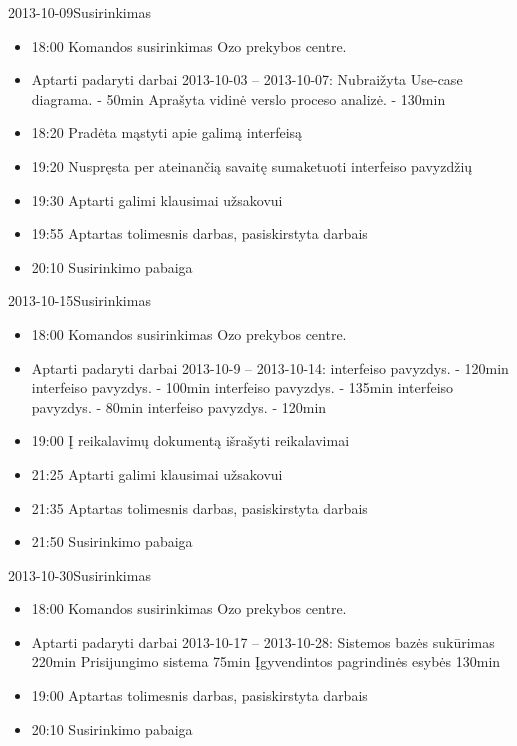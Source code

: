 \begin{loggentry}{2013-10-09}{Susirinkimas}

	\begin{itemize}
		\item 18:00 Komandos susirinkimas Ozo prekybos centre.
		\item Aptarti padaryti darbai 2013-10-03 – 2013-10-07:
			\subitem Nubraižyta Use-case diagrama. - 50min
			\subitem Aprašyta vidinė verslo proceso analizė. - 130min
		\item 18:20 Pradėta mąstyti apie galimą interfeisą
		\item 19:20 Nuspręsta per ateinančią savaitę sumaketuoti interfeiso pavyzdžių
		\item 19:30 Aptarti galimi klausimai užsakovui
		\item 19:55 Aptartas tolimesnis darbas, pasiskirstyta darbais
		\item 20:10 Susirinkimo pabaiga
	\end{itemize}
\end{loggentry}

\begin{loggentry}{2013-10-15}{Susirinkimas}

	\begin{itemize}
		\item 18:00 Komandos susirinkimas Ozo prekybos centre.
		\item Aptarti padaryti darbai 2013-10-9 – 2013-10-14:
			 interfeiso pavyzdys. - 120min
			 interfeiso pavyzdys. - 100min
			 interfeiso pavyzdys. - 135min
			 interfeiso pavyzdys. - 80min
			 interfeiso pavyzdys. - 120min
		\item 19:00 Į reikalavimų dokumentą išrašyti reikalavimai
		\item 21:25 Aptarti galimi klausimai užsakovui
		\item 21:35 Aptartas tolimesnis darbas, pasiskirstyta darbais
		\item 21:50 Susirinkimo pabaiga
	\end{itemize}
\end{loggentry}

\begin{loggentry}{2013-10-30}{Susirinkimas}

	\begin{itemize}
		\item 18:00 Komandos susirinkimas Ozo prekybos centre.
		\item Aptarti padaryti darbai 2013-10-17 – 2013-10-28:
			\subitem Sistemos bazės sukūrimas 220min
			\subitem Prisijungimo sistema 75min
			\subitem Įgyvendintos pagrindinės esybės 130min
		\item 19:00 Aptartas tolimesnis darbas, pasiskirstyta darbais
		\item 20:10 Susirinkimo pabaiga
	\end{itemize}
\end{loggentry}

